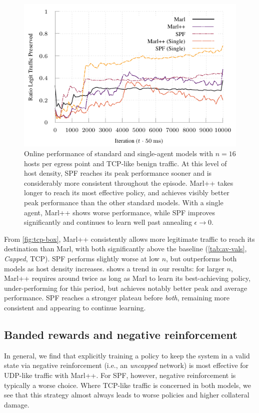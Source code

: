 \documentclass[conference, a4paper, 10pt, times]{IEEEtran}
\begin{document}
\begin{figure}
	\centering
	\includegraphics[width=0.95\linewidth]{../plots/tcp-16-single}
	
	\caption{
		Online performance of standard and single-agent models with $n=16$ hosts per egress point and TCP-like benign traffic.
		At this level of host density, SPF reaches its peak performance sooner and is considerably more consistent throughout the episode.
		Marl++ takes longer to reach its most effective policy, and achieves visibly better peak performance than the other standard models.
		With a single agent, Marl++ shows worse performance, while SPF improves significantly and continues to learn well past annealing $\epsilon \rightarrow 0$.
		\label{fig:tcp-16}
	}
\end{figure}

From \cref{fig:tcp-box}, Marl++ consistently allows more legitimate traffic to reach its destination than Marl, with both significantly above the baseline (\cref{tab:av-vals}, \emph{Capped}, TCP).
SPF performs slightly worse at low $n$, but outperforms both models as host density increases.
 shows a trend in our results: for larger $n$, Marl++ requires around twice as long as Marl to learn its best-achieving policy, under-performing for this period, but achieves notably better peak and average performance.
SPF reaches a stronger plateau before \emph{both}, remaining more consistent and appearing to continue learning.

\subsection{Banded rewards and negative reinforcement}
In general, we find that explicitly training a policy to keep the system in a valid state via negative reinforcement (i.e., an \emph{uncapped} network) is most effective for UDP-like traffic with Marl++.
For SPF, however, negative reinforcement is typically a worse choice.
Where TCP-like traffic is concerned in both models, we see that this strategy almost always leads to worse policies and higher collateral damage.
\end{document}
